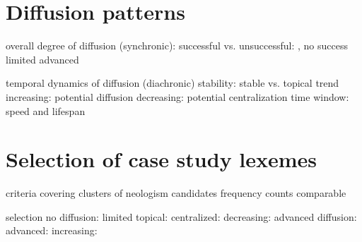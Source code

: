 \section{Diffusion patterns}

  overall degree of diffusion (synchronic): successful vs. unsuccessful: , 
    no success
    limited
    advanced

  temporal dynamics of diffusion (diachronic)
    stability: stable vs. topical 
    trend
    increasing: potential diffusion
    decreasing: potential centralization
    time window: speed and lifespan

\section{Selection of case study lexemes}

  criteria
    covering clusters of neologism candidates
    frequency counts comparable

  selection
    no diffusion: 
    limited
    topical: 
    centralized: 
    decreasing: 
    advanced diffusion:
    advanced: 
    increasing: 
